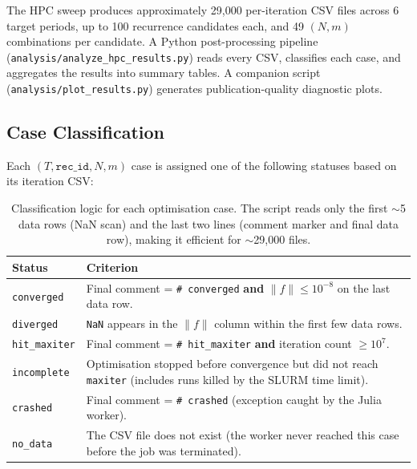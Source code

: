 \documentclass[11pt,a4paper]{article}
\begin{document}
The HPC sweep produces approximately 29,000 per-iteration CSV files across
6 target periods, up to 100 recurrence candidates each, and 49 $(N,m)$
combinations per candidate.  A Python post-processing pipeline
(\texttt{analysis/analyze\_hpc\_results.py}) reads every CSV, classifies each
case, and aggregates the results into summary tables.  A companion script
(\texttt{analysis/plot\_results.py}) generates publication-quality
diagnostic plots.

\subsection{Case Classification}
Each $(T, \texttt{rec\_id}, N, m)$ case is assigned one of the following
statuses based on its iteration CSV:

\begin{table}[htbp]
  \centering
  \caption{Classification logic for each optimisation case.  The script reads
           only the first $\sim$5 data rows (NaN scan) and the last two lines
           (comment marker and final data row), making it efficient for
           $\sim$29,000 files.}
  \label{tab:classification}
  \begin{tabular}{@{}lp{9cm}@{}}
    \toprule
    \textbf{Status} & \textbf{Criterion} \\
    \midrule
    \texttt{converged}
        & Final comment = \texttt{\# converged} \textbf{and}
          $\|f\| \le 10^{-8}$ on the last data row. \\
    \texttt{diverged}
        & \texttt{NaN} appears in the $\|f\|$ column within the
          first few data rows. \\
    \texttt{hit\_maxiter}
        & Final comment = \texttt{\# hit\_maxiter} \textbf{and}
          iteration count $\ge 10^7$. \\
    \texttt{incomplete}
        & Optimisation stopped before convergence but did not reach
          \texttt{maxiter} (includes runs killed by the SLURM time limit). \\
    \texttt{crashed}
        & Final comment = \texttt{\# crashed} (exception caught by the
          Julia worker). \\
    \texttt{no\_data}
        & The CSV file does not exist (the worker never reached this case
          before the job was terminated). \\
    \bottomrule
  \end{tabular}
\end{table}
\end{document}
